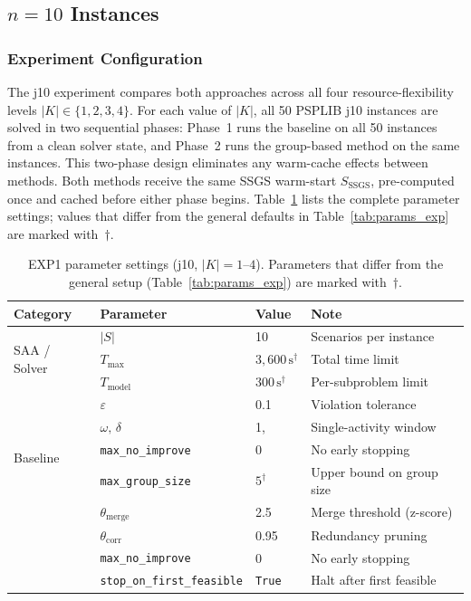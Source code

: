 \subsection{\texorpdfstring{$n=10$}{n=10} Instances}
\label{subsec:n10_results}
\subsubsection*{Experiment Configuration}
The j10 experiment compares both approaches across all four
resource-flexibility levels $|K| \in \{1,2,3,4\}$.
For each value of $|K|$, all 50 PSPLIB j10 instances are solved in two
sequential phases: Phase~1 runs the baseline on all 50
instances from a clean solver state, and Phase~2 runs the
group-based method on the same instances. This two-phase design
eliminates any warm-cache effects between methods. Both methods
receive the same SSGS warm-start $S_{\mathrm{SSGS}}$,
pre-computed once and cached before either phase begins.
Table~\ref{tab:exp1_params} lists the complete parameter
settings; values that differ from the general defaults in
Table~\ref{tab:params_exp} are marked with~$\dagger$.
\begin{table}[htbp]
\centering
\renewcommand{\arraystretch}{1.35}
\caption{EXP1 parameter settings (j10, $|K|=1\text{--}4$).
         Parameters that differ from the general setup
         (Table~\ref{tab:params_exp}) are marked with~$\dagger$.}
\label{tab:exp1_params}
\begin{tabular}{llll}
\hline
\textbf{Category} & \textbf{Parameter} & \textbf{Value} & \textbf{Note} \\
\hline
\multirow{3}{*}{SAA / Solver}
    & $|S|$                               & 10                    & Scenarios per instance \\
    & $T_{\max}$                          & $3{,}600\,\text{s}^\dagger$ & Total time limit \\
    & $T_{\mathrm{model}}$                & $300\,\text{s}^\dagger$     & Per-subproblem limit \\
    & $\varepsilon$                       & 0.1                   & Violation tolerance \\
\hline
\multirow{3}{*}{Baseline}
    & $\omega,\,\delta$                   & 1,\;0                 & Single-activity window \\
    & \texttt{max\_no\_improve}           & 0                     & No early stopping \\
\hline
\multirow{5}{*}{Group-based}
    & \texttt{max\_group\_size}           & $5^\dagger$           & Upper bound on group size \\
    & $\theta_{\mathrm{merge}}$           & 2.5                   & Merge threshold (z-score) \\
    & $\theta_{\mathrm{corr}}$            & 0.95                  & Redundancy pruning \\
    & \texttt{max\_no\_improve}           & 0                     & No early stopping \\
    & \texttt{stop\_on\_first\_feasible}  & \texttt{True}         & Halt after first feasible \\
\hline
\end{tabular}
\end{table}
